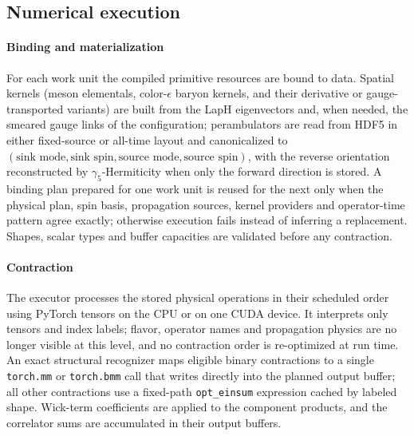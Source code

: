 \documentclass[a4paper,fleqn]{cas-dc}
\begin{document}
\subsection{Numerical execution}
\label{sec:numerical_execution}

\paragraph{Binding and materialization}
For each work unit the compiled primitive resources are bound to data. Spatial
kernels (meson elementals, color-\(\epsilon\) baryon kernels, and their
derivative or gauge-transported variants) are built from the LapH eigenvectors
and, when needed, the smeared gauge links of the configuration; perambulators are
read from HDF5 in either fixed-source or all-time layout and canonicalized to
\((\text{sink mode},\text{sink spin},\text{source mode},\text{source spin})\),
with the reverse orientation reconstructed by \(\gamma_5\)-Hermiticity when only
the forward direction is stored. A binding plan prepared for one work unit is
reused for the next only when the physical plan, spin basis, propagation sources,
kernel providers and operator-time pattern agree exactly; otherwise execution
fails instead of inferring a replacement. Shapes, scalar types and buffer
capacities are validated before any contraction.

\paragraph{Contraction}
The executor processes the stored physical operations in their scheduled order
using PyTorch tensors on the CPU or on one CUDA device. It interprets only tensors
and index labels; flavor, operator names and propagation physics are no longer
visible at this level, and no contraction order is re-optimized at run time. An
exact structural recognizer maps eligible binary contractions to a single
\texttt{torch.mm} or \texttt{torch.bmm} call that writes directly into the planned
output buffer; all other contractions use a fixed-path \texttt{opt\_einsum}
expression cached by labeled shape. Wick-term coefficients are applied to the
component products, and the correlator sums are accumulated in their output
buffers.
\end{document}
